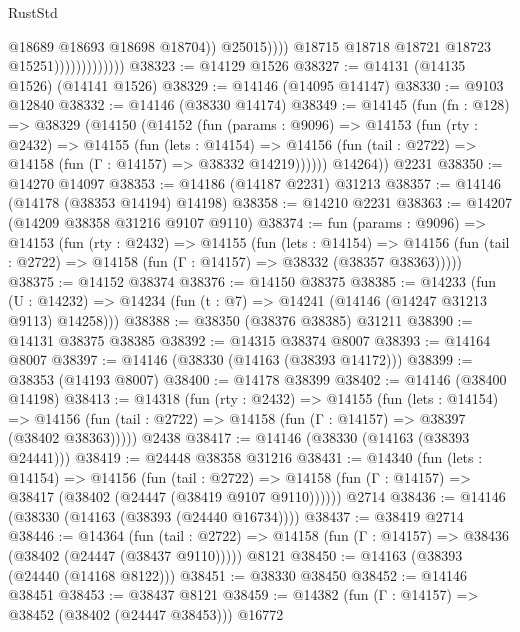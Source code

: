 \begin{lexlean}{RustStd}
\begin{coremodule}
                                          @18689
                                          @18693
                                          @18698
                                          @18704))
                                      @25015))))
                              @18715
                              @18718
                              @18721
                              @18723
                              @15251)))))))))))))
@38323 := @14129 @1526
@38327 := @14131 (@14135 @1526) (@14141 @1526)
@38329 := @14146 (@14095 @14147)
@38330 := @9103 @12840
@38332 := @14146 (@38330 @14174)
@38349 := @14145
    (fun (fn : @128) =>
    @38329
      (@14150
        (@14152
          (fun (params : @9096) =>
          @14153
            (fun (rty : @2432) =>
            @14155
              (fun (lets : @14154) =>
              @14156 (fun (tail : @2722) => @14158 (fun (Γ : @14157) => @38332 @14219))))))
        @14264))
    @2231
@38350 := @14270 @14097
@38353 := @14186 (@14187 @2231) @31213
@38357 := @14146 (@14178 (@38353 @14194) @14198)
@38358 := @14210 @2231
@38363 := @14207 (@14209 @38358 @31216 @9107 @9110)
@38374 := fun (params : @9096) =>
  @14153
    (fun (rty : @2432) =>
    @14155
      (fun (lets : @14154) =>
      @14156 (fun (tail : @2722) => @14158 (fun (Γ : @14157) => @38332 (@38357 @38363)))))
@38375 := @14152 @38374
@38376 := @14150 @38375
@38385 := @14233
    (fun (U : @14232) => @14234 (fun (t : @7) => @14241 (@14146 (@14247 @31213 @9113) @14258)))
@38388 := @38350 (@38376 @38385) @31211
@38390 := @14131 @38375 @38385
@38392 := @14315 @38374 @8007
@38393 := @14164 @8007
@38397 := @14146 (@38330 (@14163 (@38393 @14172)))
@38399 := @38353 (@14193 @8007)
@38400 := @14178 @38399
@38402 := @14146 (@38400 @14198)
@38413 := @14318
    (fun (rty : @2432) =>
    @14155
      (fun (lets : @14154) =>
      @14156 (fun (tail : @2722) => @14158 (fun (Γ : @14157) => @38397 (@38402 @38363)))))
    @2438
@38417 := @14146 (@38330 (@14163 (@38393 @24441)))
@38419 := @24448 @38358 @31216
@38431 := @14340
    (fun (lets : @14154) =>
    @14156
      (fun (tail : @2722) =>
      @14158 (fun (Γ : @14157) => @38417 (@38402 (@24447 (@38419 @9107 @9110))))))
    @2714
@38436 := @14146 (@38330 (@14163 (@38393 (@24440 @16734))))
@38437 := @38419 @2714
@38446 := @14364
    (fun (tail : @2722) => @14158 (fun (Γ : @14157) => @38436 (@38402 (@24447 (@38437 @9110)))))
    @8121
@38450 := @14163 (@38393 (@24440 (@14168 @8122)))
@38451 := @38330 @38450
@38452 := @14146 @38451
@38453 := @38437 @8121
@38459 := @14382 (fun (Γ : @14157) => @38452 (@38402 (@24447 @38453))) @16772

\end{coremodule}
\end{lexlean}
